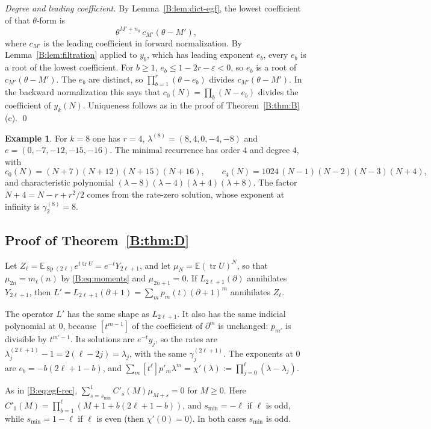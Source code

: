\documentclass[11pt,a4paper]{article}
\theoremstyle{definition}
\newtheorem{example}[theorem]{Example}
\theoremstyle{remark}
\newcommand{\E}{\mathbb E}
\newcommand{\ff}[2]{#1^{\underline{#2}}}
\DeclareMathOperator{\tr}{tr}
\DeclareMathOperator{\Sp}{Sp}
\numberwithin{equation}{section}
\begin{document}
\emph{Degree and leading coefficient.} By Lemma~\ref{B:lem:dict-egf}, the lowest coefficient of that $\theta$-form is
\[
\ff{\theta}{M'+n_0}\,c_{M'}(\theta-M'),
\]
where $c_{M'}$ is the leading coefficient in forward normalization. By Lemma~\ref{B:lem:filtration} applied to $y_b$, which has leading exponent $e_b$, every $e_b$ is a root of the lowest coefficient. For $b\ge1$, $e_b\le1-2r-\varepsilon<0$, so $e_b$ is a root of $c_{M'}(\theta-M')$. The $e_b$ are distinct, so $\prod_{b=1}^r(\theta-e_b)$ divides $c_{M'}(\theta-M')$. In the backward normalization this says that $c_0(N)=\prod_b(N-e_b)$ divides the coefficient of $y_k(N)$. Uniqueness follows as in the proof of Theorem~\ref{B:thm:B}(c). \qed

\begin{example}
For $k=8$ one has $r=4$, $\lambda^{(8)}=(8,4,0,-4,-8)$ and $e=(0,-7,-12,-15,-16)$. The minimal recurrence has order $4$ and degree $4$, with
\[
c_0(N)=(N+7)(N+12)(N+15)(N+16),\qquad c_4(N)=1024\,(N-1)(N-2)(N-3)(N+4),
\]
and characteristic polynomial $(\lambda-8)(\lambda-4)(\lambda+4)(\lambda+8)$. The factor $N+4=N-r+r^2/2$ comes from the rate-zero solution, whose exponent at infinity is $\gamma^{(8)}_2=8$.
\end{example}

\subsection{Proof of Theorem~\ref{B:thm:D}}
Let $Z_\ell=\E_{\Sp(2\ell)}e^{t\tr U}=e^{-t}Y_{2\ell+1}$, and let $\mu_N=\E(\tr U)^N$, so that $\mu_{2n}=m_\ell(n)$ by \eqref{B:eq:moments} and $\mu_{2n+1}=0$. If $L_{2\ell+1}(\partial)$ annihilates $Y_{2\ell+1}$, then $L'=L_{2\ell+1}(\partial+1)=\sum_mp_m(t)(\partial+1)^m$ annihilates $Z_\ell$.

The operator $L'$ has the same shape as $L_{2\ell+1}$. It also has the same indicial polynomial at $0$, because $[t^{m-1}]$ of the coefficient of $\partial^m$ is unchanged: $p_{m'}$ is divisible by $t^{m'-1}$. Its solutions are $e^{-t}y_j$, so the rates are $\lambda^{(2\ell+1)}_j-1=2(\ell-2j)=\lambda_j$, with the same $\gamma^{(2\ell+1)}_j$. The exponents at $0$ are $e_b=-b(2\ell+1-b)$, and $\sum_m[t^\ell]p'_m\lambda^m=\chi'(\lambda):=\prod_{j=0}^{\ell}(\lambda-\lambda_j)$.

As in \eqref{B:eq:egf-rec}, $\sum_{s=s_{\min}}^{1}C'_s(M)\mu_{M+s}=0$ for $M\ge0$. Here $C'_1(M)=\prod_{b=1}^{\ell}(M+1+b(2\ell+1-b))$, and $s_{\min}=-\ell$ if $\ell$ is odd, while $s_{\min}=1-\ell$ if $\ell$ is even (then $\chi'(0)=0$). In both cases $s_{\min}$ is odd.
\end{document}
